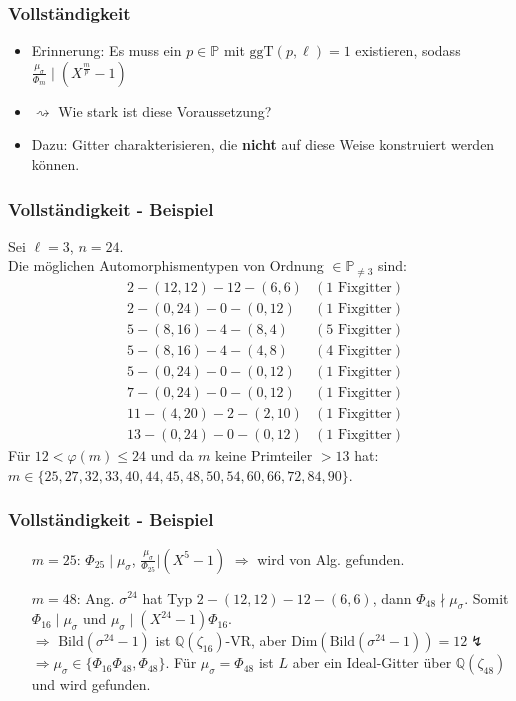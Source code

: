 \documentclass{beamer}
\newcommand{\Q}{\mathbb{Q}}
\renewcommand{\P}{\mathbb{P}}
\newcommand{\Bild}{\text{Bild}}
\newcommand{\ggT}{\text{ggT}}
\newcommand{\Dim}{\text{Dim}}
\begin{document}
\begin{frame}[plain]
	\frametitle{Vollständigkeit}
	\begin{itemize}
	\item Erinnerung: Es muss ein $p \in \P$ mit $\ggT(p, \ell) = 1$ existieren, sodass $\frac{\mu_\sigma}{\Phi_m} \mid (X^\frac{m}{p} - 1)$\\
	\pause
	\item $\rightsquigarrow$ Wie stark ist diese Voraussetzung?\\
	\pause
	\item Dazu: Gitter charakterisieren, die \textbf{nicht} auf diese Weise konstruiert werden können.
	\end{itemize}
\end{frame}

\begin{frame}[plain]
	\frametitle{Vollständigkeit - Beispiel}
	Sei $\ell = 3$, $n = 24$.\\
	\pause
	Die möglichen Automorphismentypen von Ordnung $\in \P_{\neq 3}$ sind:\\
	\begin{align*}
		&2 - (12, 12) - 12 - (6, 6)		&(1 \text{ Fixgitter})\\
		&2 - (0, 24) - 0 - (0, 12)		&(1 \text{ Fixgitter})\\
		&5 - (8, 16) - 4 - (8, 4)		&(5 \text{ Fixgitter})\\
		&5 - (8, 16) - 4 - (4, 8) 		&(4 \text{ Fixgitter})\\
		&5 - (0, 24) - 0 - (0, 12) 		&(1 \text{ Fixgitter})\\
		&7 - (0, 24) - 0 - (0, 12) 		&(1 \text{ Fixgitter})\\
		&11 - (4, 20) - 2 - (2, 10) 	&(1 \text{ Fixgitter})\\
		&13 - (0, 24) - 0 - (0, 12) 	&(1 \text{ Fixgitter})
	\end{align*}
	\pause
	Für $12 < \varphi(m) \leq 24$ und da $m$ keine Primteiler $> 13$ hat: $m \in \lbrace 25, 27, 32, 33, 40, 44, 45, 48, 50, 54, 60, 66, 72, 84, 90\rbrace$.
\end{frame}

\begin{frame}[plain]
	\frametitle{Vollständigkeit - Beispiel}
	\begin{itemize}
		\item[$m = 25$:] $\Phi_{25} \mid \mu_\sigma$, $\frac{\mu_\sigma}{\Phi_{25}} \vert (X^5-1)$ $\Rightarrow$ wird von Alg. gefunden.
		\pause
		\item[$m = 48$:] Ang. $\sigma^{24}$ hat Typ $2 - (12, 12) - 12 - (6, 6)$, dann $\Phi_{48} \nmid \mu_\sigma$. Somit $\Phi_{16} \mid \mu_\sigma$ und $\mu_\sigma \mid (X^{24}-1) \Phi_{16}$.\\
		$\Rightarrow$ $\Bild(\sigma^{24}-1)$ ist $\Q(\zeta_{16})$-VR, aber $\Dim(\Bild(\sigma^{24}-1)) = 12 \lightning$\\
		$\Rightarrow \mu_\sigma \in \lbrace \Phi_{16} \Phi_{48}, \Phi_{48} \rbrace$. Für $\mu_\sigma = \Phi_{48}$ ist $L$ aber ein Ideal-Gitter über $\Q(\zeta_{48})$ und wird gefunden.
	\end{itemize}
\end{frame}
\end{document}

